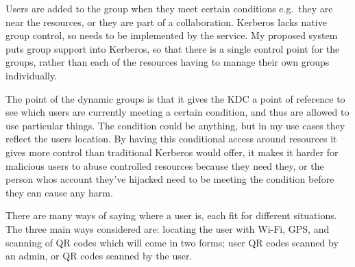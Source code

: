 \documentclass[]{report}   %
\begin{document}
Users are added to the group when they meet certain conditions e.g.\ they are near the resources, or they are part of a collaboration. Kerberos lacks native group control, so needs to be implemented by the service. My proposed system puts group support into Kerberos, so that there is a single control point for the groups, rather than each of the resources having to manage their own groups individually.

The point of the dynamic groups is that it gives the KDC a point of reference to see which users are currently meeting a certain condition, and thus are allowed to use particular things. The condition could be anything, but in my use cases they reflect the users location. By having this conditional access around resources it gives more control than traditional Kerberos would offer, it makes it harder for malicious users to abuse controlled resources because they need they, or the person whos account they've hijacked need to be meeting the condition before they can cause any harm.

There are many ways of saying where a user is, each fit for different situations. The three main ways considered are: locating the user with Wi-Fi, GPS, and scanning of QR codes which will come in two forms; user QR codes scanned by an admin, or QR codes scanned by the user.
\end{document}
